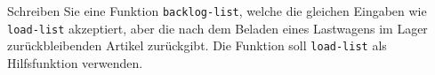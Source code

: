 \begin{aufgabe}
  Schreiben Sie eine Funktion \texttt{backlog-list}, welche die
  gleichen Eingaben wie \texttt{load-list} akzeptiert, aber die
  nach dem Beladen eines Lastwagens im Lager zurückbleibenden Artikel
  zurückgibt.  Die Funktion soll 
  \texttt{load-list} als Hilfsfunktion verwenden.
\end{aufgabe}

